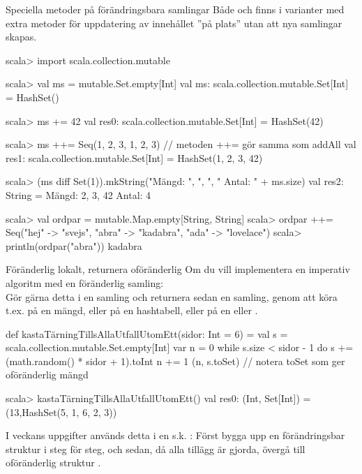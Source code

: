 \begin{Slide}{Speciella metoder på förändringsbara samlingar}\SlideFontSmall
Både  och  finns i  varianter med extra metoder för uppdatering av innehållet ''på plats'' utan att nya samlingar skapas.
\begin{REPL}
scala> import scala.collection.mutable

scala> val ms = mutable.Set.empty[Int]
val ms: scala.collection.mutable.Set[Int] = HashSet()

scala> ms += 42
val res0: scala.collection.mutable.Set[Int] = HashSet(42)

scala> ms ++= Seq(1, 2, 3, 1, 2, 3)  // metoden ++= gör samma som addAll 
val res1: scala.collection.mutable.Set[Int] = HashSet(1, 2, 3, 42)

scala> (ms diff Set(1)).mkString("Mängd: ", ", ", " Antal: " + ms.size)
val res2: String = Mängd: 2, 3, 42 Antal: 4

scala> val ordpar = mutable.Map.empty[String, String]
scala> ordpar ++= Seq("hej" -> "svejs", "abra" -> "kadabra", "ada" -> "lovelace")
scala> println(ordpar("abra"))
kadabra
\end{REPL}
\end{Slide}


\begin{Slide}{Föränderlig lokalt, returnera oföränderlig}
\SlideFontSmall
Om du vill implementera en imperativ algoritm med en föränderlig samling:\\
Gör gärna detta  i en  samling och returnera sedan en  samling, genom att köra t.ex.  på en mängd, eller  på en hashtabell, eller  på en  eller .
\begin{Code}
def kastaTärningTillsAllaUtfallUtomEtt(sidor: Int = 6) = 
  val s = scala.collection.mutable.Set.empty[Int]
  var n = 0
  while s.size < sidor - 1 do
    s += (math.random() * sidor + 1).toInt
    n += 1
  (n, s.toSet)   // notera toSet som ger oföränderlig mängd
\end{Code}
\begin{REPL}
scala> kastaTärningTillsAllaUtfallUtomEtt()
val res0: (Int, Set[Int]) = (13,HashSet(5, 1, 6, 2, 3))
\end{REPL}
I veckans uppgifter används detta i en s.k. : Först bygga upp en förändringsbar struktur i  steg för steg,  
och sedan, då alla tillägg är gjorda, övergå till oföränderlig struktur . 
\end{Slide}


